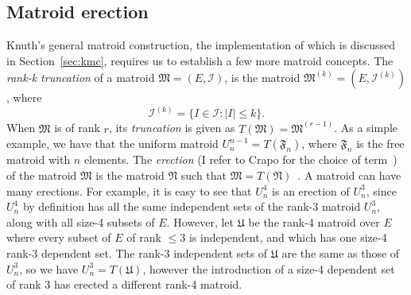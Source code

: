 \subsection{Matroid erection}
Knuth's general matroid construction, the implementation of which is discussed in Section~\ref{sec:kmc}, requires us to establish a few more matroid concepts. The \textit{rank-k truncation} of a matroid $\mathfrak{M} = (E, \mathcal{I})$, is the matroid $\mathfrak{M}^{(k)} = (E, \mathcal{I}^{(k)})$, where
$$\mathcal{I}^{(k)} = \{ I \in \mathcal{I} : |I| \leq k \}.$$
When $\mathfrak{M}$ is of rank $r$, its \textit{truncation} is given as $T(\mathfrak{M}) = \mathfrak{M}^{(r-1)}$. As a simple example, we have that the uniform matroid $U_n^{n-1} = T(\mathfrak{F}_n)$, where $\mathfrak{F}_n$ is the free matroid with $n$ elements. The \textit{erection} (I refer to Crapo for the choice of term~\cite{Crapo1970}) of the matroid $\mathfrak{M}$ is the matroid $\mathfrak{N}$ such that $\mathfrak{M} = T(\mathfrak{N})$~\cite{Crapo1970}. A matroid can have many erections. For example, it is easy to see that $U_n^4$ is an erection of $U_n^3$, since $U_n^4$ by definition has all the same independent sets of the rank-3 matroid $U_n^3$, along with all size-4 subsets of $E$. However, let $\mathfrak{U}$ be the rank-4 matroid over $E$ where every subset of $E$ of rank $\leq 3$ is independent, and which has one size-4 rank-3 dependent set. The rank-3 independent sets of $\mathfrak{U}$ are the same as those of $U_n^3$, so we have $U_n^3 = T({\mathfrak{U}})$, however the introduction of a size-4 dependent set of rank 3 has erected a different rank-4 matroid.

